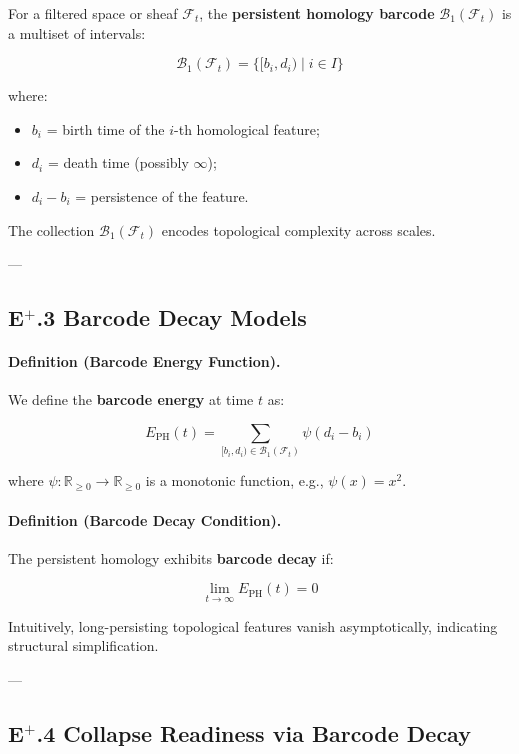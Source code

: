\documentclass[11pt]{article}
\begin{document}
For a filtered space or sheaf $\mathcal{F}_t$, the \textbf{persistent homology barcode} $\mathcal{B}_1(\mathcal{F}_t)$ is a multiset of intervals:

\[
\mathcal{B}_1(\mathcal{F}_t) = \{ [b_i, d_i) \mid i \in I \}
\]

where:

\begin{itemize}
    \item $b_i$ = birth time of the $i$-th homological feature;
    \item $d_i$ = death time (possibly $\infty$);
    \item $d_i - b_i$ = persistence of the feature.
\end{itemize}

The collection $\mathcal{B}_1(\mathcal{F}_t)$ encodes topological complexity across scales.

---

\subsection*{E$^{+}$.3 Barcode Decay Models}

\paragraph{Definition (Barcode Energy Function).}

We define the \textbf{barcode energy} at time $t$ as:

\[
E_{\mathrm{PH}}(t) = \sum_{[b_i, d_i) \in \mathcal{B}_1(\mathcal{F}_t)} \psi(d_i - b_i)
\]

where $\psi : \mathbb{R}_{\geq 0} \to \mathbb{R}_{\geq 0}$ is a monotonic function, e.g., $\psi(x) = x^2$.

\paragraph{Definition (Barcode Decay Condition).}

The persistent homology exhibits \textbf{barcode decay} if:

\[
\lim_{t \to \infty} E_{\mathrm{PH}}(t) = 0
\]

Intuitively, long-persisting topological features vanish asymptotically, indicating structural simplification.

---

\subsection*{E$^{+}$.4 Collapse Readiness via Barcode Decay}
\end{document}
